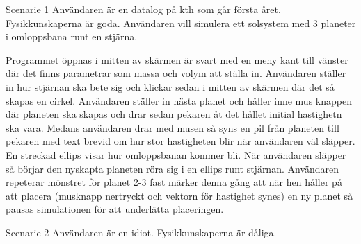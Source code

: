 Scenarie 1 %
Användaren är en datalog på kth som går första året.
Fysikkunskaperna är goda. Användaren vill simulera ett solsystem med 3 planeter i omloppsbana runt en stjärna.

Programmet öppnas i mitten av skärmen är svart med en meny kant till vänster där det finns parametrar som massa och volym att ställa in.
Användaren ställer in hur stjärnan ska bete sig och klickar sedan i mitten av skärmen där det så skapas en cirkel.
Användaren ställer in nästa planet och håller inne mus knappen där planeten ska skapas och drar sedan pekaren åt det hållet initial hastighetn ska vara.
Medans användaren drar med musen så syns en pil från planeten till pekaren med text brevid om hur stor hastigheten blir när användaren väl släpper.
En streckad ellips visar hur omloppsbanan kommer bli.
När användaren släpper så börjar den nyskapta planeten röra sig i en ellips runt stjärnan.
Användaren repeterar mönstret för planet 2-3 fast märker denna gång att när hen håller på att placera (musknapp nertryckt och vektorn för hastighet synes) en ny planet så pausas simulationen för att underlätta placeringen.


Scenarie 2
Användaren är en idiot.
Fysikkunskaperna är dåliga.
